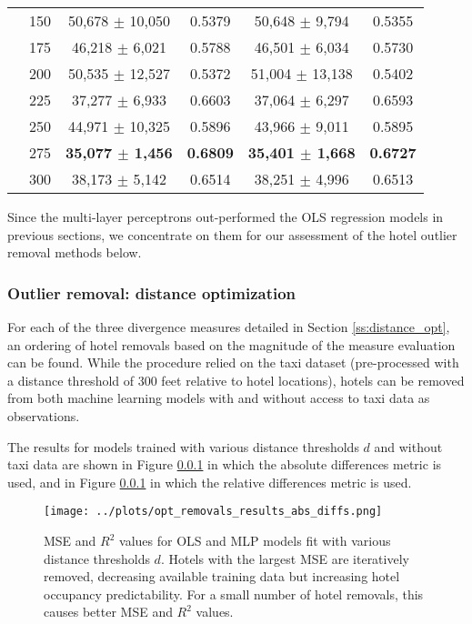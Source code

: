 \documentclass[useAMS, usenatbib]{biom}
\begin{document}
\begin{table}
\begin{center}
{\begin{tabular}{||c|c|c|c|c|c||}
 & 150 & 50,678 $\pm$ 10,050 & 0.5379 & 50,648 $\pm$ 9,794 & 0.5355 \\
 & 175 & 46,218 $\pm$ 6,021 & 0.5788 & 46,501 $\pm$ 6,034 & 0.5730 \\
 & 200 & 50,535 $\pm$ 12,527 & 0.5372 & 51,004 $\pm$ 13,138 & 0.5402 \\
 & 225 & 37,277 $\pm$ 6,933 & 0.6603 & 37,064 $\pm$ 6,297 & 0.6593 \\
 & 250 & 44,971 $\pm$ 10,325 & 0.5896 & 43,966 $\pm$ 9,011 & 0.5895 \\
 & 275 & \textbf{35,077 $\pm$ 1,456} & \textbf{0.6809} & \textbf{35,401 $\pm$ 1,668} & \textbf{0.6727} \\
 & 300 & 38,173 $\pm$ 5,142 & 0.6514 & 38,251 $\pm$ 4,996 & 0.6513 \\
 \hline
\end{tabular}
}
\end{center}
\end{table}

Since the multi-layer perceptrons out-performed the OLS regression models in previous sections, we concentrate on them for our assessment of the hotel outlier removal methods below.

\subsubsection{Outlier removal: distance optimization}

For each of the three divergence measures detailed in Section \ref{ss:distance_opt}, an ordering of hotel removals based on the magnitude of the measure evaluation can be found. While the procedure relied on the taxi dataset (pre-processed with a distance threshold of 300 feet relative to hotel locations), hotels can be removed from both machine learning models with and without access to taxi data as observations.

The results for models trained with various distance thresholds $d$ and without taxi data are shown in Figure \ref{} in which the absolute differences metric is used, and in Figure \ref{} in which the relative differences metric is used.

\begin{figure}
	\centering
    \captionsetup{justification=centering}
	\texttt{[image: ../plots/opt\_removals\_results\_abs\_diffs.png]}
	\caption{MSE and $R^2$ values for OLS and MLP models fit with various distance thresholds $d$. Hotels with the largest MSE are iteratively removed, decreasing available training data but increasing hotel occupancy predictability. For a small number of hotel removals, this causes better MSE and $R^2$ values.}
	\label{fig:abs_diffs_removals}
\end{figure}
\end{document}
